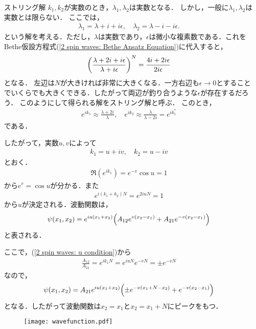 \documentclass[\main/main.tex]{subfiles}
\begin{document}
\begin{frame}{ストリング解}
    $k_1, k_2$が実数のとき，$\lambda_1,\lambda_2$は実数となる．
    しかし，一般に$\lambda_1, \lambda_2$は実数とは限らない．
    ここでは，
    \begin{align}
        \lambda_1 = \lambda + i + i\epsilon, \quad
        \lambda_2 = \lambda - i - i\epsilon.
        \label{2 spin waves: string solution}
    \end{align}
    という解を考える．ただし，$\lambda$は実数であり，$\epsilon$は微小な複素数である．これをBethe仮設方程式(\ref{2 spin waves: Bethe Ansatz Equation})に代入すると，
    \begin{align}
        \qty(\frac{\lambda + 2i + i\epsilon}{\lambda + i\epsilon})^N = \frac{4i + 2i\epsilon}{2i\epsilon}
    \end{align}
    となる．
    左辺は$N$が大きければ非常に大きくなる．一方右辺も$\epsilon \to 0$とすることでいくらでも大きくできる．したがって両辺が釣り合うような$\epsilon$が存在するだろう．
    このようにして得られる解をストリング解と呼ぶ．
    このとき，
    \begin{align}
        e^{ik_1} \approx \frac{\lambda + 2i}{\lambda},
        \quad
        e^{ik_2} \approx \frac{\lambda}{\lambda - 2i} = e^{ik_1^*}
    \end{align}
    である．
\end{frame}

\begin{frame}
    したがって，実数$u,v$によって
    \begin{align}
        k_1 = u+iv,\quad k_2 = u-iv
    \end{align}
    とおく．
    \begin{align}
        \Re (e^{ik_1}) = e^{-v}\cos u = 1
    \end{align}
    から$e^v = \cos u$が分かる．また
    \begin{align}
        e^{i(k_1+k_2)N} = e^{2iuN} = 1
        \label{2 spin waves: u condition}
    \end{align}
    から$u$が決定される．波動関数は，
    \begin{align}
        \psi(x_1, x_2) = e^{iu(x_1+x_2)} \qty(A_{12}e^{v(x_2-x_1)} + A_{21}e^{-v(x_2-x_1)})
    \end{align}
    と表される．
\end{frame}

\begin{frame}{}
    ここで，(\ref{2 spin waves: u condition})から
    \begin{align}
        \frac{A_{12}}{A_{21}} = e^{ik_1 N} = e^{iuN} e^{-vN} = \pm e^{-vN}
    \end{align}
    なので，
    \begin{align}
        \psi(x_1, x_2) = A_{21} e^{iu(x_1+x_2)} \qty(\pm e^{-v(x_1 + N - x_2)} + e^{-v(x_2-x_1)})
    \end{align}
    となる．したがって波動関数は$x_2 = x_1$と$x_2 = x_1 + N$にピークをもつ．
    \begin{figure}[H]
        \centering
        \texttt{[image: wavefunction.pdf]}
    \end{figure}
\end{frame}
\end{document}
